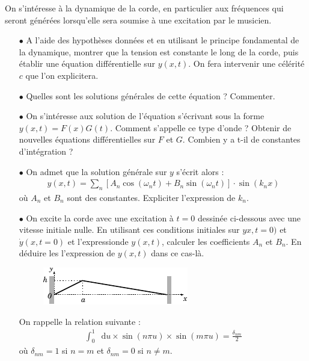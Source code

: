 \documentclass{report}
\newcommand*\dif{\mathop{}\!\mathrm{d}}
\begin{document}
On s'intéresse à la dynamique de la corde, en particulier aux fréquences qui seront générées lorsqu'elle sera soumise à une excitation par le musicien.

\begin{itemize}

\item[$\bullet$] A l'aide des hypothèses données et en utilisant le principe fondamental de la dynamique, montrer que la tension est constante le long de la corde, puis établir une équation différentielle sur $y(x,t)$. On fera intervenir une célérité $c$ que l'on explicitera. 

\item[$\bullet$] Quelles sont les solutions générales de cette équation ? Commenter.

\item[$\bullet$] On s'intéresse aux solution de l'équation s'écrivant sous la forme $y(x,t)=F(x)G(t)$. Comment s'appelle ce type d'onde ? Obtenir de nouvelles équations différentielles sur $F$ et $G$. Combien y a t-il de constantes d'intégration ?

\item[$\bullet$] On admet que la solution générale sur $y$ s'écrit alors : 
\begin{align*}
	y(x,t)=\sum_n \left[A_n\cos(\omega_nt) + B_n\sin(\omega_nt)\right] \cdot\sin(k_nx)
\end{align*}
où $A_n$ et $B_n$ sont des constantes. Expliciter l'expression de $k_n$. 

\item[$\bullet$] On excite la corde avec une excitation à $t=0$ dessinée ci-dessous avec une vitesse initiale nulle. En utilisant ces conditions initiales sur $yx,t=0)$ et $\dot{y}(x,t=0)$ et l'expressionde $y(x,t)$, calculer les coefficients $A_n$ et $B_n$. En déduire les l'expression de $y(x,t)$ dans ce cas-là.
	
	\begin{figure}[h!]
	\centering
		\includegraphics[scale=1.5]{onde2.pdf}
	\end{figure}

On rappelle la relation suivante :
	\begin{align*}
	\int_0^1\dif u\times\sin(n\pi u)\times\sin(m\pi u)=\frac{\delta_{nm}}{2}
	\end{align*}			
où $\delta_{nm}=1$ si $n=m$ et $\delta_{nm}=0$ si $n\neq m$.

\end{itemize}
\end{document}
